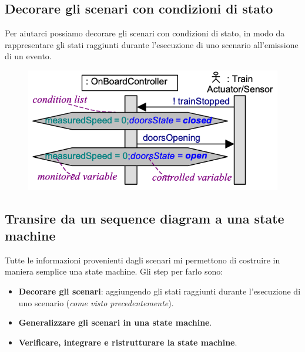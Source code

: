 \subsection{Decorare gli scenari con condizioni di stato}
Per aiutarci possiamo decorare gli scenari con condizioni di stato, in modo da
rappresentare gli stati raggiunti durante l'esecuzione di uno scenario all'emissione 
di un evento.
\begin{figure}[H]
    \centering
    \includegraphics[scale=0.5]{img/state_scenari.png}
\end{figure}
\subsection{Transire da un sequence diagram a una state machine}
Tutte le informazioni provenienti dagli scenari mi permettono di costruire in 
maniera semplice una state machine.
Gli step per farlo sono:
\begin{itemize}
    \item \textbf{Decorare gli scenari}: aggiungendo gli stati raggiunti durante
    l'esecuzione di uno scenario (\textit{come visto precedentemente}).
    \item \textbf{Generalizzare gli scenari in una state machine}.
    \item \textbf{Verificare, integrare e ristrutturare la state machine}.
\end{itemize}
